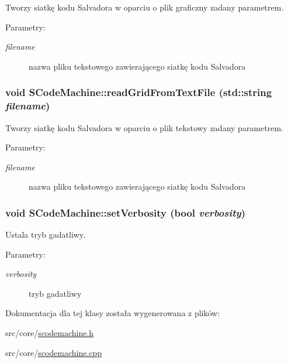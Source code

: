 Tworzy siatkę kodu Salvadora w oparciu o plik graficzny zadany parametrem. \begin{Desc}
\item[Parametry:]
\begin{description}
\item[{\em filename}]nazwa pliku tekstowego zawierającego siatkę kodu Salvadora \end{description}
\end{Desc}
\hypertarget{classSCodeMachine_b906d8d6f1faf45d6d01e45e51b7cd65}{
\subsubsection[{readGridFromTextFile}]{\setlength{\rightskip}{0pt plus 5cm}void SCodeMachine::readGridFromTextFile (std::string {\em filename})}}
\label{classSCodeMachine_b906d8d6f1faf45d6d01e45e51b7cd65}


Tworzy siatkę kodu Salvadora w oparciu o plik tekstowy zadany parametrem. \begin{Desc}
\item[Parametry:]
\begin{description}
\item[{\em filename}]nazwa pliku tekstowego zawierającego siatkę kodu Salvadora \end{description}
\end{Desc}
\hypertarget{classSCodeMachine_4a2d7edca4db9e3bd8942abc13f6c8ec}{
\subsubsection[{setVerbosity}]{\setlength{\rightskip}{0pt plus 5cm}void SCodeMachine::setVerbosity (bool {\em verbosity})}}
\label{classSCodeMachine_4a2d7edca4db9e3bd8942abc13f6c8ec}


Ustala tryb gadatliwy. \begin{Desc}
\item[Parametry:]
\begin{description}
\item[{\em verbosity}]tryb gadatliwy \end{description}
\end{Desc}


Dokumentacja dla tej klasy została wygenerowana z plików:\begin{CompactItemize}
\item 
src/core/\hyperlink{scodemachine_8h}{scodemachine.h}\item 
src/core/\hyperlink{scodemachine_8cpp}{scodemachine.cpp}\end{CompactItemize}
